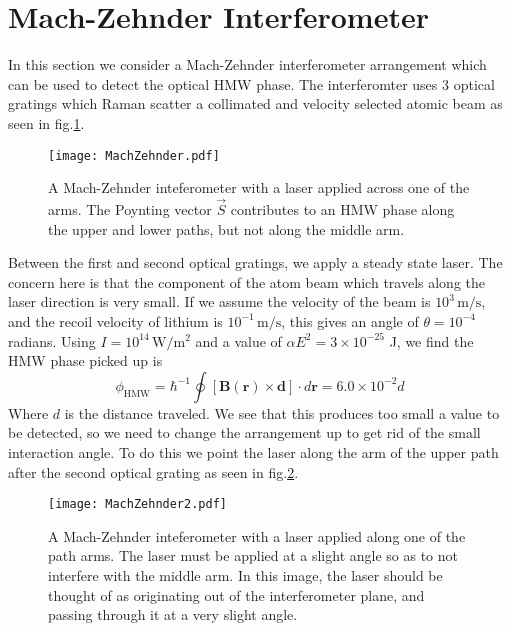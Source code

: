 \documentclass[twocolumn,english,pra,aps,superscriptaddress,floatfix]{revtex4-1}
\begin{document}
\section{Mach-Zehnder Interferometer}
\label{sec:mach}
In this section we consider a Mach-Zehnder interferometer arrangement which can be used to detect the optical HMW phase.  The interferomter uses 3 optical gratings which Raman scatter a collimated and velocity selected atomic beam as seen in fig.\ref{fig:mach}.  
\begin{figure}
\texttt{[image: MachZehnder.pdf]}
\caption{A Mach-Zehnder inteferometer with a laser applied across one of the arms. The Poynting vector $\vec{S}$ contributes to an HMW phase along the upper and lower paths, but not along the middle arm.} 
\label{fig:mach}
\end{figure}
Between the first and second optical gratings, we apply a steady state laser.  The concern here is that the component of the atom beam which travels along the laser direction is very small.  If we assume the velocity of the beam is $10^3\,\mathrm{m/s}$, and the recoil velocity of lithium is $10^{-1}\,\mathrm{m/s}$, this gives an angle of $\theta=10^{-4}$ radians.  Using $I=10^{14}\,\mathrm{W/m^2}$ and a value of $\alpha E^2=3\times 10^{-25}$ J, we find the HMW phase picked up is 
\begin{equation}
\phi_{\mathrm{HMW}} = \hbar^{-1} \oint [\mathbf{B}(\mathbf{r}) \times \mathbf {d}] \cdot d \mathbf r =6.0\times 10^{-2}d
\end{equation}
Where $d$ is the distance traveled.  We see that this produces too small a value to be detected, so we need to change the arrangement up to get rid of the small interaction angle.  To do this we point the laser along the arm of the upper path after the second optical grating as seen in fig.\ref{fig:mach2}. 
\begin{figure}
\texttt{[image: MachZehnder2.pdf]}
\caption{A Mach-Zehnder inteferometer with a laser applied along one of the path arms.  The laser must be applied at a slight angle so as to not interfere with the middle arm.  In this image, the laser should be thought of as originating out of the interferometer plane, and passing through it at a very slight angle.} 
\label{fig:mach2}
\end{figure}
\end{document}
